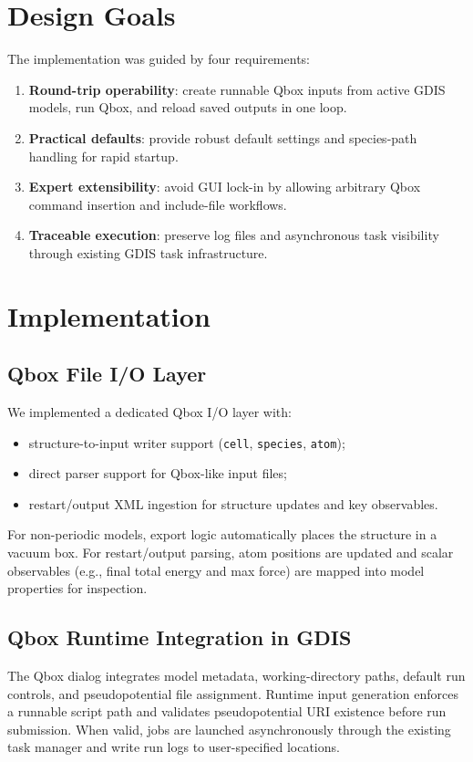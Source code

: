 \documentclass[11pt,a4paper]{article}
\begin{document}
\section{Design Goals}
The implementation was guided by four requirements:
\begin{enumerate}
  \item \textbf{Round-trip operability}: create runnable Qbox inputs from active GDIS models, run Qbox, and reload saved outputs in one loop.
  \item \textbf{Practical defaults}: provide robust default settings and species-path handling for rapid startup.
  \item \textbf{Expert extensibility}: avoid GUI lock-in by allowing arbitrary Qbox command insertion and include-file workflows.
  \item \textbf{Traceable execution}: preserve log files and asynchronous task visibility through existing GDIS task infrastructure.
\end{enumerate}

\section{Implementation}
\subsection{Qbox File I/O Layer}
We implemented a dedicated Qbox I/O layer with:
\begin{itemize}
  \item structure-to-input writer support (\texttt{cell}, \texttt{species}, \texttt{atom});
  \item direct parser support for Qbox-like input files;
  \item restart/output XML ingestion for structure updates and key observables.
\end{itemize}

For non-periodic models, export logic automatically places the structure in a vacuum box.
For restart/output parsing, atom positions are updated and scalar observables (e.g., final total energy and max force) are mapped into model properties for inspection.

\subsection{Qbox Runtime Integration in GDIS}
The Qbox dialog integrates model metadata, working-directory paths, default run controls, and pseudopotential file assignment.
Runtime input generation enforces a runnable script path and validates pseudopotential URI existence before run submission.
When valid, jobs are launched asynchronously through the existing task manager and write run logs to user-specified locations.
\end{document}
